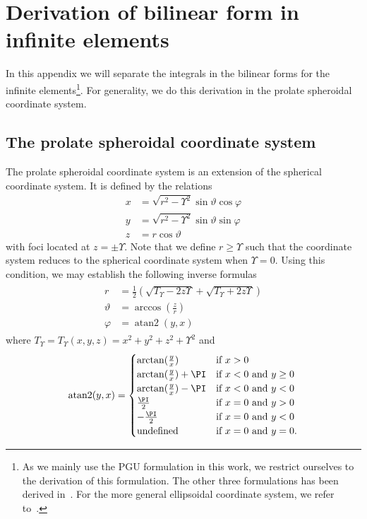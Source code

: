 \section{Derivation of bilinear form in infinite elements}
In this appendix we will separate the integrals in the bilinear forms for the infinite elements\footnote{As we mainly use the PGU formulation in this work, we restrict ourselves to the derivation of this formulation. The other three formulations has been derived in~\cite{Venas2015iao}. For the more general ellipsoidal coordinate system, we refer to~\cite{Burnett1998aea}.}. For generality, we do this derivation in the prolate spheroidal coordinate system.
\subsection{The prolate spheroidal coordinate system}
\label{Sec2:prolateSphericalCoordinateSystem}
The prolate spheroidal coordinate system is an extension of the spherical coordinate system. It is defined by the relations
\begin{align*}
	x &= \sqrt{r^2 - \Upsilon^2}\sin\vartheta\cos\varphi\\
	y &= \sqrt{r^2 - \Upsilon^2}\sin\vartheta\sin\varphi\\
	z &= r\cos\vartheta
\end{align*}
with foci located at $z = \pm \Upsilon$. Note that we define $r\geq \Upsilon$ such that the coordinate system reduces to the spherical coordinate system when $\Upsilon=0$. Using this condition, we may establish the following inverse formulas
\begin{align}\label{Eq2:XtoProl}
\begin{split}
	r &= \frac{1}{2}\left(\sqrt{T_\Upsilon-2z\Upsilon}+\sqrt{T_\Upsilon+2z\Upsilon}\right)\\
	\vartheta &= \arccos\left(\frac{z}{r}\right)\\
	\varphi &= \operatorname{atan2}(y,x)
\end{split}
\end{align}
where $T_\Upsilon = T_\Upsilon(x,y,z) = x^2+y^2+z^2+\Upsilon^2$ and 
\begin{equation*}
	\operatorname{atan2}(y,x) = \begin{cases}
	\arctan(\frac{y}{x}) & \mbox{if } x > 0\\
	\arctan(\frac{y}{x}) + \PI & \mbox{if } x < 0 \mbox{ and } y \ge 0\\
	\arctan(\frac{y}{x}) - \PI & \mbox{if } x < 0 \mbox{ and } y < 0\\
	\frac{\PI}{2} & \mbox{if } x = 0 \mbox{ and } y > 0\\
	-\frac{\PI}{2} & \mbox{if } x = 0 \mbox{ and } y < 0\\
	\text{undefined} & \mbox{if } x = 0 \mbox{ and } y = 0.
	\end{cases}
\end{equation*}

